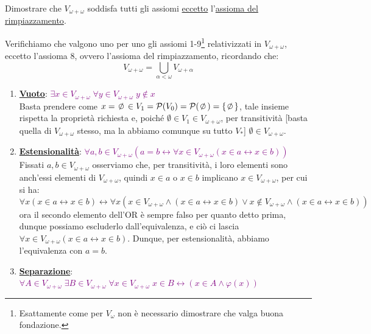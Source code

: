 \begin{exercise}
	Dimostrare che $V_{\omega + \omega}$ soddisfa tutti gli assiomi \underline{eccetto} l'\hyperref[ax8]{assioma del rimpiazzamento}.
\end{exercise}

\begin{soln}
	Verifichiamo che valgono uno per uno gli assiomi 1-9\footnote{Esattamente come per $V_\omega$ non \`e necessario dimostrare che valga buona fondazione.} relativizzati in $V_{\omega + \omega}$, eccetto l'assioma 8, ovvero l'assioma del rimpiazzamento, ricordando che:
	\[ V_{\omega + \omega} = \bigcup_{\alpha < \omega} V_{\omega + \alpha}
		\]
	\begin{enumerate}[(1)]
		\item \textbf{\underline{Vuoto}}: \textcolor{purple}{$\exists x \in V_{\omega + \omega} \; \forall y \in V_{\omega + \omega} \; y \not \in x$} \\
		Basta prendere come $x = \emptyset \in V_1 = \ps(V_0) = \ps(\emptyset) = \{\emptyset\}$, tale insieme rispetta la propriet\`a richiesta e, poich\'e $\emptyset \in V_1 \in V_{\omega + \omega}$, per transitivit\`a [basta quella di $V_{\omega + \omega}$ stesso, ma la abbiamo comunque su tutto $V_*$] $\emptyset \in V_{\omega + \omega}$.
		\item \textbf{\underline{Estensionalit\`a}}: \textcolor{purple}{$\forall a,b \in V_{\omega + \omega} (a = b \leftrightarrow \forall x \in V_{\omega + \omega} (x \in a \leftrightarrow x \in b))$} \\
		Fissati $a,b \in V_{\omega + \omega}$ osserviamo che, per transitivit\`a, i loro elementi sono anch'essi elementi di $V_{\omega + \omega}$, quindi $x \in a$ o $x \in b$ implicano $x \in V_{\omega + \omega}$, per cui si ha:
		\[ \forall x (x \in a \leftrightarrow x \in b) \leftrightarrow \forall x (x \in V_{\omega + \omega} \land (x \in a \leftrightarrow x \in b) \lor x \not \in V_{\omega + \omega} \land (x \in a \leftrightarrow x \in b))
			\] 
		ora il secondo elemento dell'OR \`e sempre falso per quanto detto prima, dunque possiamo escluderlo dall'equivalenza, e ci\`o ci lascia $\forall x \in V_{\omega + \omega} (x \in a \leftrightarrow x \in b)$.
		Dunque, per estensionalit\`a, abbiamo l'equivalenza con $a = b$.
		\item \textbf{\underline{Separazione}}: \textcolor{purple}{$\forall A \in V_{\omega + \omega} \; \exists B \in V_{\omega + \omega} \; \forall x \in V_{\omega + \omega} \; x \in B \leftrightarrow (x \in A \land \varphi(x))$} \\

\end{enumerate}
\end{soln}
